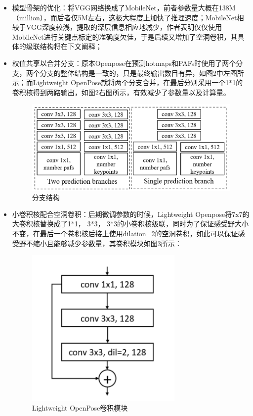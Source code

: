 \documentclass[12pt,a4paper]{article}%
\begin{document}
\begin{itemize}
\item
  模型骨架的优化：将VGG网络换成了MobileNet，前者参数量大概在138M（million），而后者仅5M左右，这极大程度上加快了推理速度；MobileNet相较于VGG深度较浅，提取的深层信息相应地减少，作者表明仅仅使用MobileNet进行关键点标定的准确度欠佳，于是后续又增加了空洞卷积，其具体的级联结构将在下文阐释；
\item
  权值共享以合并分支：原本Openpose在预测hotmaps和PAFs时使用了两个分支，两个分支的整体结构是一致的，只是最终输出数目有异，如图2中左图所示；而Lightweight
  OpenPose就将两个分支合并，在最后分别采用一个1*1的卷积核得到两路输出，如图2右图所示，有效减少了参数量以及计算量。

  \begin{figure}[!h]
  \centering
  \includegraphics[width=.9\textwidth]{./Part3-Design.pic/image-20230102141056804.png}
  \caption{分支结构}
  \end{figure}
\item
  小卷积核配合空洞卷积：后期微调参数的时候，Lightweight
  Openpose将7x7的大卷积核替换成了1*1， 3*3，
  3*3的小卷积核级联，同时为了保证感受野大小不变，在最后一个卷积核后接上使用dilation=2的空洞卷积，如此可以保证感受野不缩小且能够减少参数量，其卷积模块如图3所示：

  \begin{figure}[H]
  \centering
  \includegraphics[width=3in]{./Part3-Design.pic/image-20230102140830473.png}
  \caption{Lightweight OpenPose卷积模块}
  \end{figure}
\end{itemize}
\end{document}
